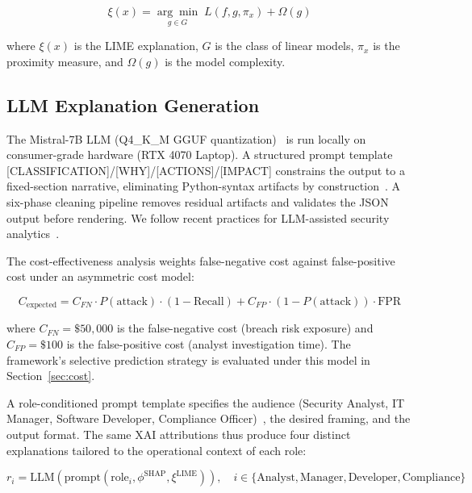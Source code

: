 \documentclass[sensors,apajournal,article,submit,moreauthors]{Definitions/mdpi}
\begin{document}
\begin{equation}
\xi(x) = \underset{g \in G}{\arg\min} \; L(f, g, \pi_x) + \Omega(g)
\end{equation}

where $\xi(x)$ is the LIME explanation, $G$ is the class of linear models, $\pi_x$ is the proximity measure, and $\Omega(g)$ is the model complexity.

\subsection{LLM Explanation Generation}

The Mistral-7B LLM (Q4\_K\_M GGUF quantization)~\citep{touvron2023llama} is run locally on \mbox{consumer-grade} hardware (RTX 4070 Laptop). A structured prompt template [CLASSIFICATION]/[WHY]/[ACTIONS]/[IMPACT] constrains the output to a fixed-section narrative, eliminating Python-syntax artifacts by construction~\citep{amann2020explainability}. A six-phase cleaning pipeline removes residual artifacts and validates the JSON output before rendering. We follow recent practices for LLM-assisted security analytics~\citep{khan2023explainable,lin2022xai,srivastava2023beyond,brown2020language}.

The \mbox{cost-effective}ness analysis weights false-negative cost against false-positive cost under an asymmetric cost model:

\begin{equation}
C_{\mathrm{expected}} = C_{FN} \cdot P(\mathrm{attack}) \cdot (1 - \mathrm{Recall}) + C_{FP} \cdot (1 - P(\mathrm{attack})) \cdot \mathrm{FPR}
\end{equation}

where $C_{FN}=\$50{,}000$ is the false-negative cost (breach risk exposure) and $C_{FP}=\$100$ is the false-positive cost (analyst investigation time). The framework's selective prediction strategy is evaluated under this model in Section~\ref{sec:cost}.

A \mbox{role-conditioned} prompt template specifies the audience (Security Analyst, IT Manager, Software Developer, Compliance Officer)~\citep{doshi2017towards}, the desired framing, and the output format. The same XAI attributions thus produce four distinct explanations tailored to the operational context of each role:

\begin{equation}
r_i = \mathrm{LLM}\!\left(\mathrm{prompt}(\mathrm{role}_i, \phi^{\mathrm{SHAP}}, \xi^{\mathrm{LIME}})\right), \quad i \in \{\text{Analyst}, \text{Manager}, \text{Developer}, \text{Compliance}\}
\end{equation}
\end{document}
